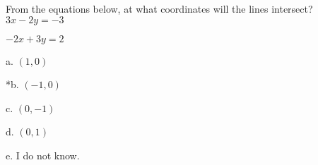 
From the equations below, at what coordinates will the lines intersect? \\

\( 3x - 2y = - 3 \)

\( - 2x + 3y = 2 \)

a. \( ( 1, 0 ) \)

*b. \( ( - 1, 0 ) \)

c. \( (0, - 1 ) \)

d. \( ( 0, 1 ) \)

e. I do not know.\\
